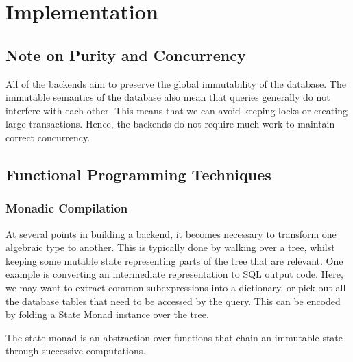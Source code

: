 \documentclass[12pt,a4paper,twoside,openright]{report}
\begin{document}
\chapter{Implementation}
\section{Note on Purity and Concurrency}
All of the backends aim to preserve the global immutability of the database. The immutable semantics of the database also mean that queries generally do not interfere with each other. This means that we can avoid keeping locks or creating large transactions. Hence, the backends do not require much work to maintain correct concurrency.
\section{Functional Programming Techniques}
	\subsection{Monadic Compilation}
	At several points in building a backend, it becomes necessary to transform one algebraic type to another. This is typically done by walking over a tree, whilst keeping some mutable state representing parts of the tree that are relevant. One example is converting an intermediate representation to SQL output code. Here, we may want to extract common subexpressions into a dictionary, or pick out all the database tables that need to be accessed by the query. This can be encoded by folding a State Monad instance over the tree.

The state monad is an abstraction over functions that chain an immutable state through successive computations.
\end{document}
